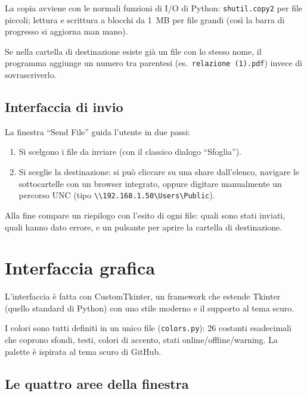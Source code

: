 \documentclass[a4paper,11pt]{article}
\begin{document}
La copia avviene con le normali funzioni di I/O di Python:
\texttt{shutil.copy2} per file piccoli; lettura e scrittura a
blocchi da 1~MB per file grandi (così la barra di progresso si
aggiorna man mano).

Se nella cartella di destinazione esiste già un file con lo
stesso nome, il programma aggiunge un numero tra parentesi
(es.\ \texttt{relazione~(1).pdf}) invece di sovrascriverlo.

\subsection{Interfaccia di invio}

La finestra ``Send File'' guida l'utente in due passi:

\begin{enumerate}[nosep]
  \item Si scelgono i file da inviare (con il classico dialogo
        ``Sfoglia'').
  \item Si sceglie la destinazione: si può cliccare su una share
        dall'elenco, navigare le sottocartelle con un browser
        integrato, oppure digitare manualmente un percorso UNC
        (tipo \verb|\\192.168.1.50\Users\Public|).
\end{enumerate}

Alla fine compare un riepilogo con l'esito di ogni file: quali
sono stati inviati, quali hanno dato errore, e un pulsante per
aprire la cartella di destinazione.


\section{Interfaccia grafica}

L'interfaccia è fatta con CustomTkinter, un framework che
estende Tkinter (quello standard di Python) con uno stile
moderno e il supporto al tema scuro.

I colori sono tutti definiti in un unico file
(\texttt{colors.py}): 26 costanti esadecimali che coprono
sfondi, testi, colori di accento, stati online/offline/warning.
La palette è ispirata al tema scuro di GitHub.

\subsection{Le quattro aree della finestra}
\end{document}
